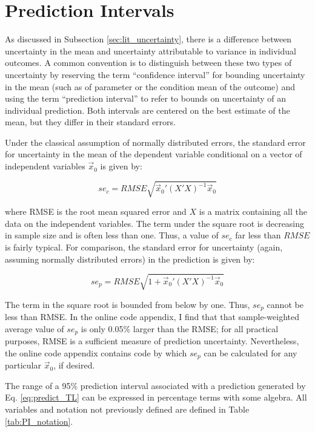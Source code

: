 \section{Prediction Intervals}\label{apdx:prediction_interval}

As discussed in Subsection \ref{sec:lit_uncertainty}, there is a difference between uncertainty in the mean and uncertainty attributable to variance in individual outcomes. A common convention is to distinguish between these two types of uncertainty by reserving the term ``confidence interval'' for bounding uncertainty in the mean (such as of parameter or the condition mean of the outcome) and using the term ``prediction interval'' to refer to bounds on uncertainty of an individual prediction. Both intervals are centered on the best estimate of the mean, but they differ in their standard errors.

Under the classical assumption of normally distributed errors, the standard error for uncertainty in the mean of the dependent variable conditional on a vector of independent variables $\vec{x}_0$ is given by:

\begin{equation} \label{eq:se_c}
se_{c} = RMSE \sqrt{\vec{x}_0' (X'X)^{-1} \vec{x}_0}
\end{equation}

where RMSE is the root mean squared error and $X$ is a matrix containing all the data on the independent variables. The term under the square root is decreasing in sample size and is often less than one. Thus, a value of $se_{c}$ far less than $RMSE$ is fairly typical. For comparison, the standard error for uncertainty (again, assuming normally distributed errors) in the prediction is given by:

\begin{equation} \label{eq:se_p}
se_{p} = RMSE \sqrt{1+\vec{x}_0' (X'X)^{-1} \vec{x}_0}
\end{equation}

The term in the square root is bounded from below by one. Thus, $se_{p}$ cannot be less than RMSE. In the online code appendix, I find that that sample-weighted average value of $se_{p}$ is only 0.05\% larger than the RMSE; for all practical purposes, RMSE is a sufficient measure of prediction uncertainty. Nevertheless, the online code appendix contains code by which $se_{p}$ can be calculated for any particular $\vec{x}_0$, if desired. 

The range of a 95\% prediction interval associated with a prediction generated by Eq. \ref{eq:predict_TL} can be expressed in percentage terms with some algebra. All variables and notation not previously defined are defined in Table \ref{tab:PI_notation}.

